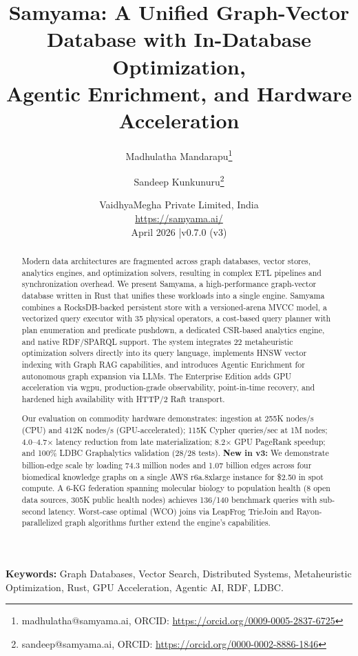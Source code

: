 \documentclass[11pt]{article}
\title{Samyama: A Unified Graph-Vector Database with In-Database Optimization,\\Agentic Enrichment, and Hardware Acceleration}
\author{
  Madhulatha Mandarapu\thanks{madhulatha@samyama.ai, ORCID: \url{https://orcid.org/0009-0005-2837-6725}} \and
  Sandeep Kunkunuru\thanks{sandeep@samyama.ai, ORCID: \url{https://orcid.org/0000-0002-8886-1846}}
}
\date{%
  VaidhyaMegha Private Limited, India\\[2pt]
  \url{https://samyama.ai/}\\[8pt]
  April 2026 \quad|\quad v0.7.0 (v3)
}
\begin{document}
\maketitle

\begin{abstract}
Modern data architectures are fragmented across graph databases, vector stores, analytics engines, and optimization solvers, resulting in complex ETL pipelines and synchronization overhead. We present Samyama, a high-performance graph-vector database written in Rust that unifies these workloads into a single engine. Samyama combines a RocksDB-backed persistent store with a versioned-arena MVCC model, a vectorized query executor with 35 physical operators, a cost-based query planner with plan enumeration and predicate pushdown, a dedicated CSR-based analytics engine, and native RDF/SPARQL support. The system integrates 22 metaheuristic optimization solvers directly into its query language, implements HNSW vector indexing with Graph RAG capabilities, and introduces Agentic Enrichment for autonomous graph expansion via LLMs. The Enterprise Edition adds GPU acceleration via wgpu, production-grade observability, point-in-time recovery, and hardened high availability with HTTP/2 Raft transport.

Our evaluation on commodity hardware demonstrates: ingestion at 255K nodes/s (CPU) and 412K nodes/s (GPU-accelerated); 115K Cypher queries/sec at 1M nodes; 4.0--4.7$\times$ latency reduction from late materialization; 8.2$\times$ GPU PageRank speedup; and 100\% LDBC Graphalytics validation (28/28 tests). \textbf{New in v3:} We demonstrate billion-edge scale by loading 74.3 million nodes and 1.07 billion edges across four biomedical knowledge graphs on a single AWS r6a.8xlarge instance for \$2.50 in spot compute. A 6-KG federation spanning molecular biology to population health (8 open data sources, 305K public health nodes) achieves 136/140 benchmark queries with sub-second latency. Worst-case optimal (WCO) joins via LeapFrog TrieJoin and Rayon-parallelized graph algorithms further extend the engine's capabilities.
\end{abstract}

\noindent\textbf{Keywords:} Graph Databases, Vector Search, Distributed Systems, Metaheuristic Optimization, Rust, GPU Acceleration, Agentic AI, RDF, LDBC.

\end{document}
